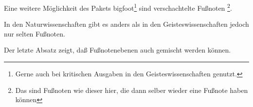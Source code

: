 \documentclass[a5paper]{article}
\begin{document}
Eine weitere Möglichkeit des Pakets bigfoot\footnote{Gerne auch bei kritischen Ausgaben in
den Geisteswissenschaften genutzt.} sind verschachtelte Fußnoten%
\footnote{Das sind Fußnoten wie dieser hier, die dann selber wieder eine 
Fußnote haben können}.

In den Naturwissenschaften gibt es anders als in den Geis\-teswissenschaften jedoch nur selten Fußnoten.

Der letzte Absatz zeigt, daß Fußnotenebenen auch gemischt werden können.
\end{document}
